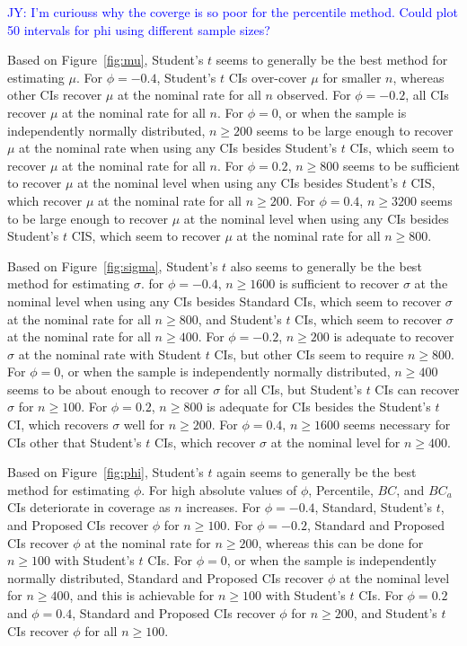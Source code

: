 \documentclass[12pt, letterpaper, titlepage]{article}
\newcommand{\jy}[1]{\textcolor{blue}{JY: #1}}
\begin{document}
\jy{I'm curiouss why the coverge is so poor for the percentile method. Could
  plot 50 intervals for phi using different sample sizes?}

Based on Figure~\ref{fig:mu}, Student's $t$ seems to generally
be the best method for estimating $\mu$.
For $\phi = -0.4$, Student's $t$ CIs over-cover 
$\mu$ for smaller $n$, whereas other CIs recover $\mu$ at the
nominal rate for all $n$ observed. For 
$\phi = -0.2$, 
all CIs recover $\mu$ at the nominal rate for all $n$. For $\phi = 0$, or when the 
sample is independently normally distributed, $n \geq 200$ seems to 
be large enough to recover $\mu$ at the nominal rate when using any CIs
 besides Student's $t$ CIs, which seem to recover $\mu$ at the nominal rate for
  all $n$.
For $\phi = 0.2$, $n \geq 800$ seems to be sufficient to recover $\mu$
at the nominal level when using
any CIs besides Student's $t$ CIS, which recover $\mu$ at the nominal
 rate for all $n \geq 200$.
For $\phi = 0.4$, $n \geq 3200$ seems to be large enough to recover $\mu$
at the nominal level when using
any CIs besides Student's $t$ CIS, which seem to recover $\mu$ at the nominal
 rate for all $n \geq 800$.

Based on Figure~\ref{fig:sigma}, Student's $t$ also seems to generally
be the best method for estimating $\sigma$.
for $\phi = -0.4$, $n \geq 1600$ is sufficient to recover $\sigma$
at the nominal level when using
any CIs besides Standard CIs, which seem to recover $\sigma$ at the nominal 
rate for all $n \geq 800$, and Student's $t$ CIs, which seem to recover $\sigma$
at the nominal rate for all $n \geq 400$. For $\phi = -0.2$, $n \geq 200$ is 
adequate to recover $\sigma$ at the nominal rate with Student $t$ CIs, 
but other CIs seem to require $n \geq 800$. For $\phi = 0$, or when the sample
is independently normally distributed, $n \geq 400$ seems to be about enough
to recover $\sigma$ for all CIs, but Student's $t$ CIs can recover $\sigma$ for
$n \geq 100$. For $\phi = 0.2$, $n \geq 800$ is adequate for CIs besides the
Student's $t$ CI, which recovers $\sigma$ well for $n \geq 200$. For 
$\phi  = 0.4$, $n \geq 1600$ seems necessary for CIs other that Student's $t$ 
CIs, which recover $\sigma$ at the nominal level for $n \geq 400$.



Based on Figure~\ref{fig:phi}, Student's $t$ again seems to generally
be the best method for estimating $\phi$. For high absolute values of $\phi$, 
Percentile, $BC$, and $BC_a$ CIs
deteriorate in coverage as $n$ increases. For $\phi = -0.4$, Standard, Student's
$t$, and Proposed CIs recover $\phi$ for $n \geq 100$. For $\phi = -0.2$, 
Standard and Proposed CIs recover $\phi$ at the nominal rate for $n \geq 200$, 
whereas this can be done for $n \geq 100$ with Student's $t$ CIs. For $\phi = 
0$, or when the sample
is independently normally distributed, Standard and Proposed CIs recover 
$\phi$ at the nominal level  for $n \geq 400$, and this is achievable for 
$n \geq 100$ with Student's $t$ CIs. For $\phi = 0.2$ and $\phi = 0.4$, Standard 
and Proposed CIs recover $\phi$ for $n \geq 200$, and Student's $t$ CIs 
recover $\phi$ for all $n \geq 100$.
\end{document}

